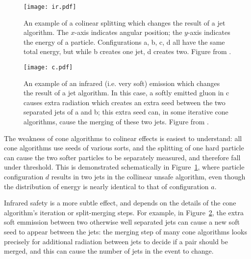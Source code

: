 
\begin{figure}
\centering
\texttt{[image: ir.pdf]}
\label{fig:jets:ir}
\caption{An example of a colinear splitting which changes the result of a jet algorithm. The $x$-axis indicates angular position; the $y$-axis indicates the energy of a particle. Configurations a, b, c, d all have the same total energy, but while b creates one jet, d creates two. Figure from \cite{Jetography}.}
\end{figure}



\begin{figure}
\centering
\texttt{[image: c.pdf]}
\label{fig:jets:c}
\caption{An example of an infrared (i.e. very soft) emission which changes the result of a jet algorithm. In this case, a softly emitted gluon in c causes extra radiation which creates an extra seed between the two separated jets of a and b; this extra seed can, in some iterative cone algorithms, cause the merging of these two jets. Figure from \cite{Jetography}.}
\end{figure}


The weakness of cone algorithms to colinear effects is easiest to understand: all cone algorithms use seeds of various sorts, and the splitting of one hard particle can cause the two softer particles to be separately measured, and therefore fall under threshold. This is demonstrated schematically in Figure~\ref{fig:jets:ir}, where particle configuration $d$ results in two jets in the collinear unsafe algorithm, even though the distribution of energy is nearly identical to that of configuration $a$.

Infrared safety is a more subtle effect, and depends on the details of the cone algorithm's iteration or split-merging steps. For example, in Figure~\ref{fig:jets:c}, the extra soft emmission between two otherwise well separated jets can cause a new soft seed to appear between the jets: the merging step of many cone algorithms looks precisely for additional radiation between jets to decide if a pair should be merged, and this can cause the number of jets in the event to change.

